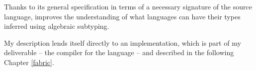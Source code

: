 Thanks to its general specification in terms of a necessary signature of the source language, \inference{} improves the understanding of what languages can have their types inferred using algebraic subtyping.

My description lends itself directly to an implementation, which is part of my deliverable -- the \compiler{} compiler for the \fabric{} language -- and described in the following Chapter \ref{fabric}.
